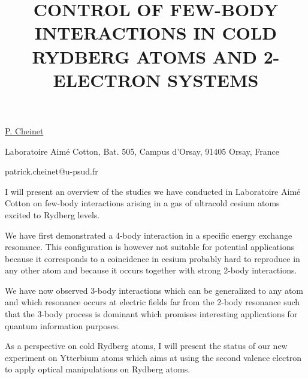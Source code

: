 \title{CONTROL OF FEW-BODY INTERACTIONS IN COLD RYDBERG ATOMS AND 2-ELECTRON SYSTEMS}

\underline{P. Cheinet} 

{\normalsize{\vspace{-4mm}
Laboratoire Aim\'e Cotton,
Bat. 505, Campus d'Orsay,
91405 Orsay,
France

\email patrick.cheinet@u-psud.fr}}

I will present an overview of the studies we have conducted in
Laboratoire Aim\'e Cotton on few-body interactions arising in a gas of
ultracold cesium atoms excited to Rydberg levels.

We have first demonstrated a 4-body interaction in a specific energy
exchange resonance. This configuration is however not suitable for
potential applications because it corresponds to a coincidence in cesium
probably hard to reproduce in any other atom and because it occurs
together with strong 2-body interactions.

We have now observed 3-body interactions which can be generalized to any
atom and which resonance occurs at electric fields far from the 2-body
resonance such that the 3-body process is dominant which promises
interesting applications for quantum information purposes.

As a perspective on cold Rydberg atoms, I will present the status of our
new experiment on Ytterbium atoms which aims at using the second valence
electron to apply optical manipulations on Rydberg atoms.


\vspace{\baselineskip}
